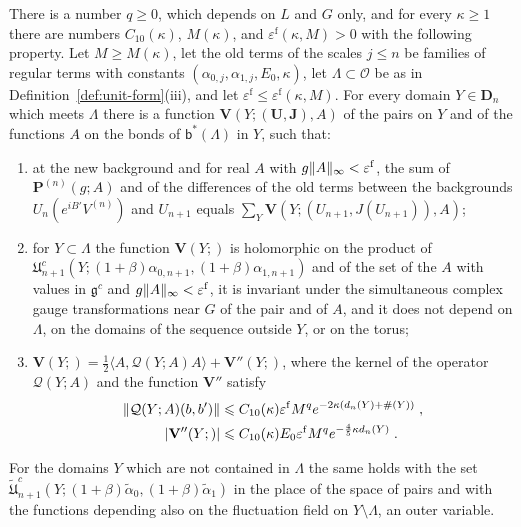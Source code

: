 \documentclass[11pt]{preprint}
\makeatletter
\DeclarePairedDelimiter{\abs}{\lvert}{\rvert}
\DeclarePairedDelimiter{\norm}{\lVert}{\rVert}
\newcommand*{\bigcdot}{}%
\DeclareRobustCommand*{\bigcdot}{%
	\mathbin{\mathpalette\bigcdot@{}}%
}
\newcommand*{\bigcdot@scalefactor}{.7}
\newcommand*{\bigcdot@widthfactor}{1.15}
\newcommand*{\bigcdot@}[2]{%
	\sbox0{$#1\vcenter{}$}%
	\sbox2{$#1\cdot\m@th$}%
	\hbox to \bigcdot@widthfactor\wd2{%
		\hss
		\raise\ht0\hbox{%
			\scalebox{\bigcdot@scalefactor}{%
				\lower\ht0\hbox{$#1\bullet\m@th$}%
			}%
		}%
		\hss
	}%
}
\numberwithin{equation}{section}
\makeatother
\begin{document}
\begin{proposition}\label{prop:localised-action}
There is a number $q \geqslant 0$, which depends on $L$ and $G$ only, and for every $\kappa \geqslant 1$ there are numbers $C_{10}(\kappa)$, $M(\kappa)$, and $\varepsilon^{\mathrm f}(\kappa, M) > 0$ with the following property. Let $M \geqslant M(\kappa)$, let the old terms of the scales $j \leqslant n$ be families of regular terms with constants $(\alpha_{0,j}, \alpha_{1,j}, E_0, \kappa)$, let $\Lambda \subset \mathcal O$ be as in Definition~\ref{def:unit-form}(iii), and let $\varepsilon^{\mathrm f} \leqslant \varepsilon^{\mathrm f}(\kappa, M)$. For every domain $Y \in \mathbf D_n$ which meets $\Lambda$ there is a function $\mathbf V(Y; (\mathbf U, \mathbf J), A)$ of the pairs on $Y$ and of the functions $A$ on the bonds of $\mathsf b^*(\Lambda)$ in $Y$, such that:
\begin{enumerate}[label=(\roman*)]
\item at the new background and for real $A$ with $g\norm A_\infty< \varepsilon^{\mathrm f}$, the sum of $\mathbf P^{(n)}(g; A)$ and of the differences of the old terms between the backgrounds $U_n(e^{iB'}V^{(n)})$ and $U_{n+1}$ equals $\sum_Y\mathbf V(Y; (U_{n+1}, J(U_{n+1})), A)$;
\item for $Y \subset \Lambda$ the function $\mathbf V(Y; \bigcdot)$ is holomorphic on the product of $\mathfrak U^c_{n+1}(Y; (1 + \beta)\alpha_{0,n+1}, (1 + \beta)\alpha_{1,n+1})$ and of the set of the $A$ with values in $\mathfrak g^c$ and $g\norm A_\infty< \varepsilon^{\mathrm f}$, it is invariant under the simultaneous complex gauge transformations near $G$ of the pair and of $A$, and it does not depend on $\Lambda$, on the domains of the sequence outside $Y$, or on the torus;
\item $\mathbf V(Y; \bigcdot) = \frac{1}{2}\langle A, \mathcal Q(Y; A)A\rangle + \mathbf V''(Y; \bigcdot)$, where the kernel of the operator $\mathcal Q(Y; A)$ and the function $\mathbf V''$ satisfy
\begin{equation}\label{eq:localised-action-bounds}
\begin{aligned}
    \norm{\mathcal Q(Y; A)(b, b')} &\leqslant C_{10}(\kappa)\varepsilon^{\mathrm f}M^qe^{-2\kappa(d_n(Y) + \#(Y))}\;,\\
    \abs{\mathbf V''(Y; \bigcdot)} &\leqslant C_{10}(\kappa)E_0\varepsilon^{\mathrm f}M^qe^{-\frac{4}{5}\kappa d_n(Y)}\;.
\end{aligned}
\end{equation}
\end{enumerate}
For the domains $Y$ which are not contained in $\Lambda$ the same holds with the set $\tilde{\mathfrak U}^c_{n+1}(Y; (1 + \beta)\tilde\alpha_0, (1 + \beta)\tilde\alpha_1)$ in the place of the space of pairs and with the functions depending also on the fluctuation field on $Y \setminus \Lambda$, an outer variable.
\end{proposition}
\end{document}
